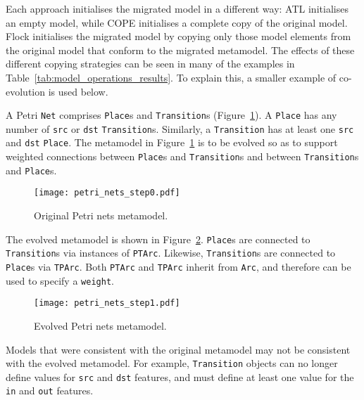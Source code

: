 Each approach initialises the migrated model in a different way: ATL initialises an empty model, while COPE initialises a complete copy of the original model. Flock initialises the migrated model by copying only those model elements from the original model that conform to the migrated metamodel. The effects of these different copying strategies can be seen in many of the examples in Table~\ref{tab:model_operations_results}. To explain this, a smaller example of co-evolution is used below.

A Petri \texttt{Net} comprises \texttt{Place}s and \texttt{Transition}s (Figure~\ref{fig:original_mm}). A \texttt{Place} has any number of \texttt{src} or \texttt{dst} \texttt{Transition}s. Similarly, a \texttt{Transition} has at least one \texttt{src} and \texttt{dst} \texttt{Place}. The metamodel in Figure~\ref{fig:original_mm} is to be evolved so as to support weighted connections between \texttt{Place}s and \texttt{Transition}s and between \texttt{Transition}s and \texttt{Place}s.

\begin{figure}[htbp]
  \centering
  \texttt{[image: petri\_nets\_step0.pdf]}
  \caption{Original Petri nets metamodel.}
  \label{fig:original_mm}
\end{figure}

The evolved metamodel is shown in Figure~\ref{fig:evolved_mm}. \texttt{Place}s are connected to \texttt{Transition}s via instances of \texttt{PTArc}. Likewise, \texttt{Transition}s are connected to \texttt{Place}s via \texttt{TPArc}. Both \texttt{PTArc} and \texttt{TPArc} inherit from \texttt{Arc}, and therefore can be used to specify a \texttt{weight}.

\begin{figure}[htbp]
  \centering
  \texttt{[image: petri\_nets\_step1.pdf]}
  \caption{Evolved Petri nets metamodel.}
  \label{fig:evolved_mm}
\end{figure}

Models that were consistent with the original metamodel may not be consistent with the evolved metamodel. For example, \texttt{Transition} objects can no longer define values for \texttt{src} and \texttt{dst} features, and must define at least one value for the \texttt{in} and \texttt{out} features.

